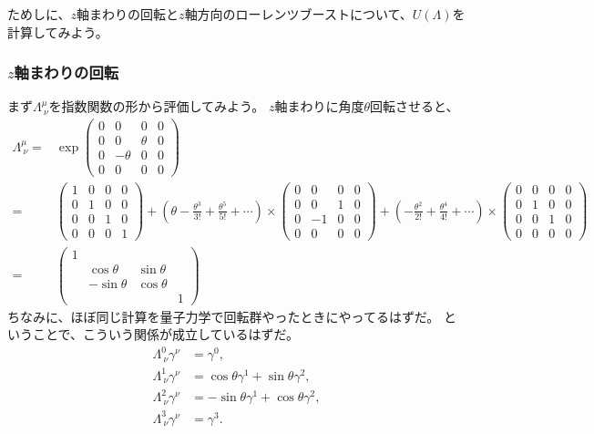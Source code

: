 \documentclass[10pt,a4paper]{jarticle}
\begin{document}
ためしに、$z$軸まわりの回転と$z$軸方向のローレンツブーストについて、$U(\Lambda)$を計算してみよう。


\subsubsection{$z$軸まわりの回転}
まず$\Lambda^\mu_{~\nu}$を指数関数の形から評価してみよう。
$z$軸まわりに角度$\theta$回転させると、
\begin{align}
\Lambda^{\mu}_{~\nu}
=&
\exp\left(
\begin{array}{cccc}
0 & 0 & 0 & 0 \\
0 & 0 & \theta & 0 \\
0 & -\theta & 0 & 0 \\
0 & 0 & 0 & 0
\end{array}
\right) \nonumber\\
%
=&
\left(\begin{array}{cccc}
1 & 0 & 0 & 0 \\
0 & 1 & 0 & 0 \\
0 & 0 & 1 & 0 \\
0 & 0 & 0 & 1
\end{array}
\right)
+
\left( \theta - \frac{\theta^3}{3!} + \frac{\theta^5}{5!} + \cdots \right) \times
\left(
\begin{array}{cccc}
0 & 0 & 0 & 0 \\
0 & 0 & 1 & 0 \\
0 & -1 & 0 & 0 \\
0 & 0 & 0 & 0
\end{array}
\right)
+
\left( - \frac{\theta^2}{2!} + \frac{\theta^4}{4!} + \cdots \right) \times
\left(\begin{array}{cccc}
0 & 0 & 0 & 0 \\
0 & 1 & 0 & 0 \\
0 & 0 & 1 & 0 \\
0 & 0 & 0 & 0
\end{array}
\right)
\nonumber\\
%
=&
\left(\begin{array}{cccc}
1 &&& \\
& \cos\theta & \sin\theta &\\
& -\sin\theta & \cos\theta &\\
&&& 1
\end{array}\right)
\end{align}
ちなみに、ほぼ同じ計算を量子力学で回転群やったときにやってるはずだ。
ということで、こういう関係が成立しているはずだ。
\begin{align}
\Lambda^0_{~\nu} \gamma^\nu &= \gamma^0 \label{eq:rotation gamma 0}, \\
\Lambda^1_{~\nu} \gamma^\nu &= \cos\theta \gamma^1 + \sin\theta\gamma^2 \label{eq:rotation gamma 1}, \\
\Lambda^2_{~\nu} \gamma^\nu &= -\sin\theta \gamma^1 + \cos\theta \gamma^2 \label{eq:rotation gamma 2}, \\
\Lambda^3_{~\nu} \gamma^\nu &= \gamma^3. \label{eq:rotation gamma 3}
\end{align}
\end{document}
